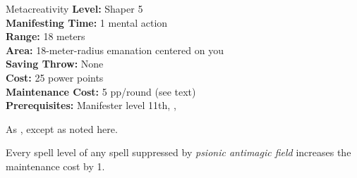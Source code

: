 {Metacreativity}
{
	\textbf{Level:}
	Shaper 5\\
	\textbf{Manifesting Time:}
	1 mental action\\
	\textbf{Range:}
	18 meters\\
	\textbf{Area:}
	18-meter-radius emanation centered on you\\
	\textbf{Saving Throw:}
	None\\
	\textbf{Cost:}
	25 power points\\
	\textbf{Maintenance Cost:}
	5 pp/round (see text)\\
	\textbf{Prerequisites:}
	Manifester level 11th, , \\
}
{
	As , except as noted here.

	Every spell level of any spell suppressed by \emph{psionic antimagic field} increases the maintenance cost by 1.
}